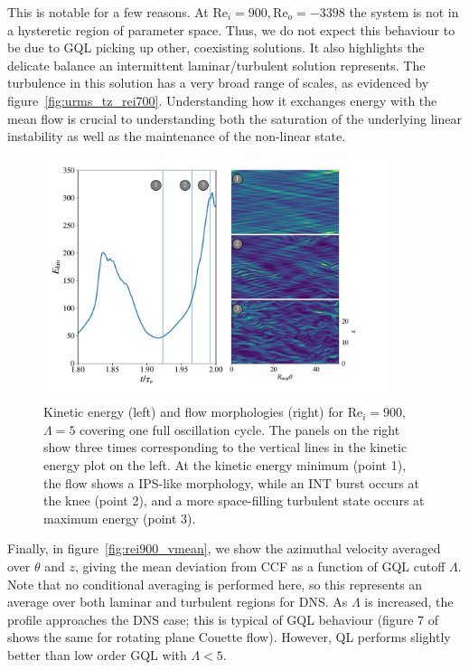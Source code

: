 \documentclass[openacc]{rstransa}%
\newcommand{\Reyn}{\mathrm{Re}}
\begin{document}
This is notable for a few reasons. At $\Reyn_i=900, \Reyn_o=-3398$ the system is not in a hysteretic region of parameter space. Thus, we do not expect this behaviour to be due to GQL picking up other, coexisting solutions. 
It also highlights the delicate balance an intermittent laminar/turbulent solution represents. The turbulence in this solution has a very broad range of scales, as evidenced by figure~\ref{fig:urms_tz_rei700}. Understanding how it exchanges energy with the mean flow is crucial to understanding both the saturation of the underlying linear instability as well as the maintenance of the non-linear state. 
\begin{figure}
    \centering
    \includegraphics[width=0.9\textwidth]{figs/rei900_story.pdf}
    \caption{Kinetic energy (left) and flow morphologies (right) for $\Reyn_i = 900$, $\Lambda = 5$ covering one full oscillation cycle. The panels on the right show three times corresponding to the vertical lines in the kinetic energy plot on the left. At the kinetic energy minimum (point 1), the flow shows a IPS-like morphology, while an INT burst occurs at the knee (point 2), and a more space-filling turbulent state occurs at maximum energy (point 3).}
    \label{fig:rei900_lambda5_story}
\end{figure}
Finally, in figure~\ref{fig:rei900_vmean}, we show the azimuthal velocity averaged over $\theta$ and $z$, giving the mean deviation from CCF as a function of GQL cutoff $\Lambda$. Note that no conditional averaging \cite{2009PhRvE..80f7301D} is performed here, so this represents an average over both laminar and turbulent regions for DNS. As $\Lambda$ is increased, the profile approaches the DNS case; this is typical of GQL behaviour (figure 7 of \cite{2017JFM...810..412T} shows the same for rotating plane Couette flow). However, QL performs slightly better than low order GQL with $\Lambda < 5$. 
\end{document}

